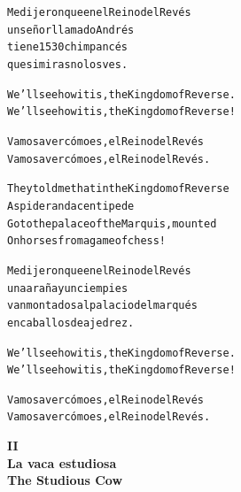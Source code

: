 \documentclass[11pt,a4paper]{article}
\begin{document}
\begin{parcolumns}[distance=8em,nofirstindent=true]{2}
\colchunk
{
\begin{alltt}\normalfont
Me dijeron que en el Reino del Revés
un señor llamado Andrés
tiene 1530 chimpancés
que si miras no los ves.
\end{alltt}
}

\colplacechunks

\colchunk
{
\begin{alltt}\normalfont
We’ll see how it is, the Kingdom of Reverse.
We’ll see how it is, the Kingdom of Reverse!
\end{alltt}
}

\colchunk
{
\begin{alltt}\normalfont
Vamos a ver cómo es, el Reino del Revés
Vamos a ver cómo es, el Reino del Revés.
\end{alltt}
}

\colplacechunks

\colchunk
{
\begin{alltt}\normalfont
They told me that in the Kingdom of Reverse
A spider and a centipede
Go to the palace of the Marquis, mounted
On horses from a game of chess!
\end{alltt}
}

\colchunk
{
\begin{alltt}\normalfont
Me dijeron que en el Reino del Revés
una araña y un ciempies
van montados al palacio del marqués
en caballos de ajedrez.
\end{alltt}
}

\colplacechunks

\colchunk
{
\begin{alltt}\normalfont
We’ll see how it is, the Kingdom of Reverse.
We’ll see how it is, the Kingdom of Reverse!
\end{alltt}
}

\colchunk
{
\begin{alltt}\normalfont
Vamos a ver cómo es, el Reino del Revés
Vamos a ver cómo es, el Reino del Revés.
\end{alltt}
}

\colplacechunks

\end{parcolumns}

\clearpage

\begin{center}
\large\textbf{
II\\
La vaca estudiosa\\
The Studious Cow
}
\end{center}
\end{document}
